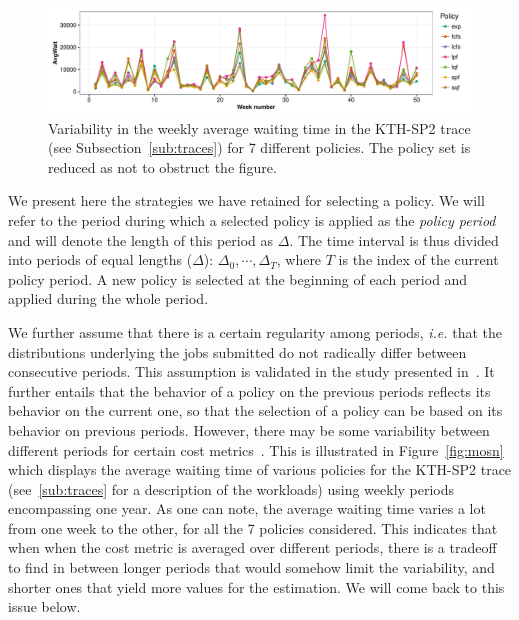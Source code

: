 \documentclass[sigconf,review,anonymous]{acmart}
\begin{document}
\begin{figure}[]
  \centering
  \includegraphics[scale=0.6]{figures/variability.pdf}

  \caption{Variability in the weekly average waiting time in the KTH-SP2 trace
  (see Subsection~\ref{sub:traces}) for 7 different policies. The policy set is
  reduced as not to obstruct the figure.}

  \label{fig:variability}
\end{figure}

We present here the strategies we have retained for selecting a policy. We will
refer to the period during which a selected policy is applied as the
\textit{policy period} and will denote the length of this period as $\Delta$.
The time interval is thus divided into periods of equal lengths ($\Delta$):
$\Delta_0, \cdots, \Delta_T$, where $T$ is the index of the current policy
period. A new policy is selected at the beginning of each period and applied
during the whole period.

We further assume that there is a certain regularity among periods,
\textit{i.e.} that the distributions underlying the jobs submitted do not
radically differ between consecutive periods. This assumption is validated in
the study presented in~\cite{jsspp17}. It further entails that the behavior of
a policy on the previous periods reflects its behavior on the current one, so
that the selection of a policy can be based on its behavior on previous
periods. However, there may be some variability between different periods for
certain cost metrics~\cite{feitelson2001metrics}. This is illustrated in
Figure~\ref{fig:mosn} which displays the average waiting time of various
policies for the KTH-SP2 trace (see~\ref{sub:traces} for a description of the
workloads) using weekly periods encompassing one year. As one can note, the
average waiting time varies a lot from one week to the other, for all the 7
policies considered. This indicates that when when the cost metric is averaged
over different periods, there is a tradeoff to find in between longer periods
that would somehow limit the variability, and shorter ones that yield more
values for the estimation. We will come back to this issue below.
\end{document}
